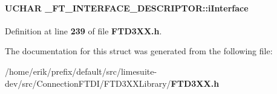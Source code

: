 \paragraph[{i\+Interface}]{\setlength{\rightskip}{0pt plus 5cm}U\+C\+H\+AR \+\_\+\+F\+T\+\_\+\+I\+N\+T\+E\+R\+F\+A\+C\+E\+\_\+\+D\+E\+S\+C\+R\+I\+P\+T\+O\+R\+::i\+Interface}\label{struct__FT__INTERFACE__DESCRIPTOR_ad6417ef431765faf379f640f6236fdcb}


Definition at line {\bf 239} of file {\bf F\+T\+D3\+X\+X.\+h}.



The documentation for this struct was generated from the following file\+:\begin{DoxyCompactItemize}
\item 
/home/erik/prefix/default/src/limesuite-\/dev/src/\+Connection\+F\+T\+D\+I/\+F\+T\+D3\+X\+X\+Library/{\bf F\+T\+D3\+X\+X.\+h}\end{DoxyCompactItemize}
